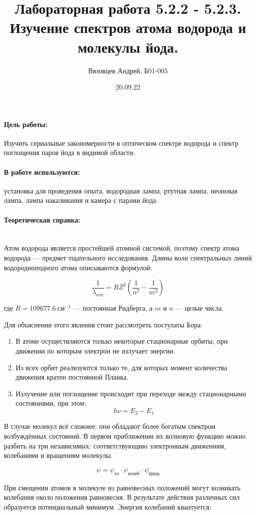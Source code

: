 \documentclass[a4paper, 12pt]{article}
\author{Вязовцев Андрей, Б01-005}
\date{20.09.22}
\title{Лабораторная работа 5.2.2 - 5.2.3. Изучение спектров атома водорода и молекулы йода.}
\newcommand{\parag}[1]{\paragraph*{#1:}}
\begin{document}
\maketitle

\parag {Цель работы} Изучить сериальные закономерности в оптическом спектре водорода и спектр поглощения паров йода в видимой области.

\parag {В работе используются} установка для проведения опыта, водородная лампа, ртутная лампа, неоновая лампа, лампа накаливания и камера с парами йода.

\parag {Теоретическая справка} ~\\

Атом водорода является простейшей атомной системой, поэтому спектр атома водорода --- предмет тщательного исследования. Длины волн спектральных линий водородноподного атома описываются формулой:

\begin{equation}
    \frac{1}{\lambda_{mn}} = R Z^2 \left( \frac{1}{n^2} - \frac{1}{m^2} \right)
    \label {eq:gen_spec}
\end{equation}

где $R = 109677.6 ~ см^{-1}$ --- постоянная Ридберга, а $m$ и $n$ --- целые числа.

Для объяснения этого явления стоит рассмотреть постулаты Бора:

\begin{enumerate}
    \item В атоме осуществляются только некоторые стационарные орбиты, при движении по которым электрон не излучает энергии.
    \item Из всех орбит реализуются только те, для которых момент количества движения кратен постоянной Планка.
    \item Излучение или поглощение происходит при переходе между стационарными состояниями, при этом:
    \[
        h\nu = E_2 - E_1
    \]
\end{enumerate}

В случае молекул всё сложнее: они обладают более богатым спектром возбуждённых состояний. В первом приближении их волновую функцию можно разбить на три независимых: соответствующию электронным движениям, колебаниям и вращениям молекулы.

\[
    \psi = \psi_{эл} \cdot \psi_{колеб} \cdot \psi_{вращ}
\]

При смещении атомов в молекуле из равновесных положений могут возникать колебания около положения равновесия. В результате действия различных сил образуется потенциальный минимум. Энергия колебаний квантуется:
\end{document}
